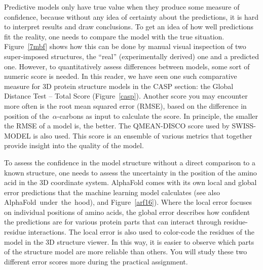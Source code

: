 Predictive models only have true value when they produce some measure of confidence, because without any idea of certainty about the predictions, it is hard to interpret results and draw conclusions.
To get an idea of how well predictions fit the reality, one needs to compare the model with the true situation.
Figure~\ref{7mbf} shows how this can be done by manual visual inspection of two super-imposed structures, the ``real'' (experimentally derived) one and a predicted one.
However, to quantitatively assess differences between models, some sort of numeric score is needed.
In this reader, we have seen one such comparative measure for 3D protein structure models in the CASP section: the Global Distance Test -- Total Score (Figure~\ref{casp}).
Another score you may encounter more often is the root mean squared error (RMSE), based on the difference in position of the~$\alpha$-carbons as input to calculate the score.
In principle, the smaller the RMSE of a model is, the better.
The QMEAN-DISCO score used by SWISS-MODEL is also used.
This score is an ensemble of various metrics that together provide insight into the quality of the model.

To assess the confidence in the model structure without a direct comparison to a known structure, one needs to assess the uncertainty in the position of the amino acid in the 3D coordinate system.
AlphaFold comes with its own local and global error predictions that the machine learning model calculates (see also AlphaFold~under~the~hood), and Figure~\ref{arf16}).
Where the local error focuses on individual positions of amino acids, the global error describes how confident the predictions are for various protein parts that can interact through residue-residue interactions.
The local error is also used to color-code the residues of the model in the 3D structure viewer.
In this way, it is easier to observe which parts of the structure model are more reliable than others.
You will study these two different error scores more during the practical assignment.


